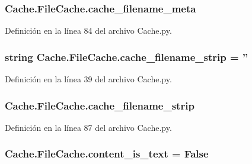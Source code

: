 \hypertarget{class_cache_1_1_file_cache_abb789c23d266d9148f2fb9c3bc3e8d3c}{
\subsubsection[{cache\-\_\-filename\-\_\-meta}]{\setlength{\rightskip}{0pt plus 5cm}Cache.\-File\-Cache.\-cache\-\_\-filename\-\_\-meta}}\label{class_cache_1_1_file_cache_abb789c23d266d9148f2fb9c3bc3e8d3c}


Definición en la línea 84 del archivo Cache.\-py.

\hypertarget{class_cache_1_1_file_cache_a2f7d1283375128a83f657d9eb2ed5d3d}{
\subsubsection[{cache\-\_\-filename\-\_\-strip}]{\setlength{\rightskip}{0pt plus 5cm}string Cache.\-File\-Cache.\-cache\-\_\-filename\-\_\-strip = ''\hspace{0.3cm}{\ttfamily [static]}}}\label{class_cache_1_1_file_cache_a2f7d1283375128a83f657d9eb2ed5d3d}


Definición en la línea 39 del archivo Cache.\-py.

\hypertarget{class_cache_1_1_file_cache_a7a879f97bdb8d6f8a5b14390db395cdf}{
\subsubsection[{cache\-\_\-filename\-\_\-strip}]{\setlength{\rightskip}{0pt plus 5cm}Cache.\-File\-Cache.\-cache\-\_\-filename\-\_\-strip}}\label{class_cache_1_1_file_cache_a7a879f97bdb8d6f8a5b14390db395cdf}


Definición en la línea 87 del archivo Cache.\-py.

\hypertarget{class_cache_1_1_file_cache_afda3d5760616e47bd8fda4fe7490d7a9}{
\subsubsection[{content\-\_\-is\-\_\-text}]{\setlength{\rightskip}{0pt plus 5cm}Cache.\-File\-Cache.\-content\-\_\-is\-\_\-text = False\hspace{0.3cm}{\ttfamily [static]}}}\label{class_cache_1_1_file_cache_afda3d5760616e47bd8fda4fe7490d7a9}


